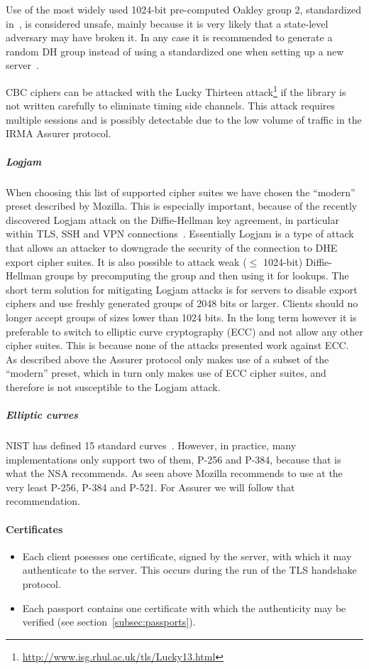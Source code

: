 Use of the most widely used 1024-bit pre-computed Oakley group 2, standardized in~\cite{ike}, is considered unsafe, mainly because it is very likely that a state-level adversary may have broken it. In any case it is recommended to generate a random DH group instead of using a standardized one when setting up a new server~\cite{logjam}.

CBC ciphers can be attacked with the Lucky Thirteen attack\footnote{\url{http://www.isg.rhul.ac.uk/tls/Lucky13.html}} if the library is not written carefully to eliminate timing side channels. This attack requires multiple sessions and is possibly detectable due to the low volume of traffic in the IRMA Assurer protocol.

\subparagraph{Logjam}
When choosing this list of supported cipher suites we have chosen the ``modern'' preset described by Mozilla. This is especially important, because of the recently discovered Logjam attack on the Diffie-Hellman key agreement, in particular within TLS, SSH and VPN connections~\cite{logjam}. Essentially Logjam is a type of attack that allows an attacker to downgrade the security of the connection to DHE export cipher suites. It is also possible to attack weak ($\leq$ 1024-bit) Diffie-Hellman groups by precomputing the group and then using it for lookups. The short term solution for mitigating Logjam attacks is for servers to disable export ciphers and use freshly generated groups of 2048 bits or larger. Clients should no longer accept groups of sizes lower than 1024 bits. In the long term however it is preferable to switch to elliptic curve cryptography (ECC) and not allow any other cipher suites. This is because none of the attacks presented work against ECC. As described above the Assurer protocol only makes use of a subset of the ``modern'' preset, which in turn only makes use of ECC cipher suites, and therefore is not susceptible to the Logjam attack.

\subparagraph{Elliptic curves}
NIST has defined 15 standard curves~\cite{dss}. However, in practice, many implementations only support two of them, P-256 and P-384, because that is what the NSA recommends. As seen above Mozilla recommends to use at the very least P-256, P-384 and P-521. For Assurer we will follow that recommendation.

\paragraph{Certificates}
\begin{itemize}
	\item Each client posesses one certificate, signed by the server, with which it may authenticate to the server. This occurs during the run of the TLS handshake protocol.
  \item Each passport contains one certificate with which the authenticity may be verified (see section~\ref{subsec:passports}).
\end{itemize}

